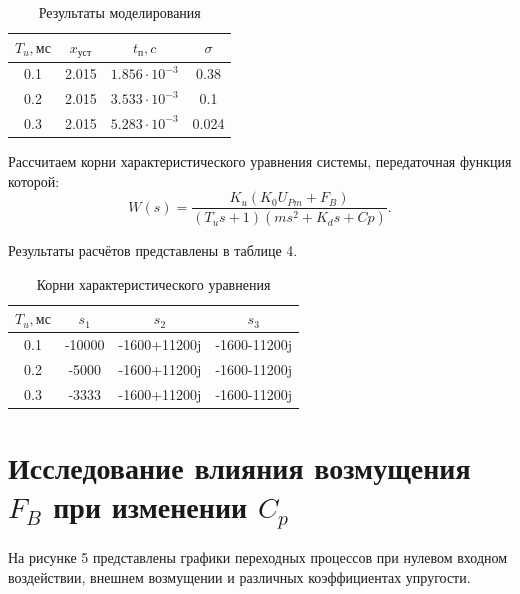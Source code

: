 \documentclass[a4paper, 12pt]{article}
\begin{document}
\begin{table}[h!]
	\centering
	\begin{threeparttable}
	\caption{Результаты моделирования}\label{tab:perflogcross}
	\begin{tabular}{|c|c|c|c|}
		\hline
		$T_u,\text{мс}$ & $x_{уст}$ & $t_\text{п},c$ & $\sigma$\\
		\hline
		0.1 & 2.015 & $1.856\cdot 10^{-3}$ & 0.38\\
		\hline
		0.2 & 2.015 & $3.533\cdot 10^{-3}$ & 0.1\\
		\hline
		0.3 & 2.015 & $5.283\cdot 10^{-3}$ & 0.024\\
		\hline
	\end{tabular}
	\end{threeparttable}
\end{table}
\newpage
\par 
Рассчитаем корни характеристического уравнения системы, передаточная функция которой:
\begin{equation}
	W(s) = \displaystyle\frac{K_u(K_0U_{Pm}+F_B)}{(T_us+1)(ms^2+K_ds+Cp)}.
\end{equation}
\par 
Результаты расчётов представлены в таблице 4.
\begin{table}[h!]
	\centering
	\begin{threeparttable}
	\caption{Корни характеристического уравнения}\label{tab:perflogcross}
	\begin{tabular}{|c|c|c|c|}
		\hline
		$T_u,\text{мс}$ & $s_1$ & $s_2$ & $s_3$\\
		\hline
		0.1 & -10000 & -1600+11200j & -1600-11200j\\
		\hline
		0.2 & -5000 & -1600+11200j & -1600-11200j\\
		\hline
		0.3 & -3333 & -1600+11200j & -1600-11200j\\
		\hline
	\end{tabular}
	\end{threeparttable}
\end{table}

\newpage
\section{Исследование влияния возмущения $F_B$ при изменении $C_p$}
\par 
На рисунке 5 представлены графики переходных процессов при нулевом входном воздействии, внешнем возмущении и различных коэффициентах упругости.
\end{document}
